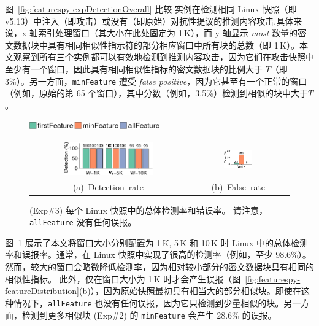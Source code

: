   图~\ref{fig:featurespy-expDetectionOverall} 比较 \sysnameF 实例在检测相同 Linux 快照（即 v5.13）中注入（即攻击）或没有（即原始）对抗性提议的推测内容攻击.具体来说，x 轴索引处理窗口（其大小在此处固定为 1\,K），而 y 轴显示 {\em most} 数量的密文数据块中具有相同相似性指示符的部分相应窗口中所有块的总数（即 1\,K）。本文观察到所有三个实例都可以有效地检测到推测内容攻击，因为它们在攻击快照中至少有一个窗口，因此具有相同相似性指标的密文数据块的比例大于 $T $（即 3\%）。另一方面，{\tt minFeature} 遭受 {\em false positive}，因为它甚至有一个正常的窗口（例如，原始的第 65 个窗口），其中分数（例如，3.5\%）检测到相似的块中大于$T$。


\begin{figure}[t]
    \centering
    \includegraphics[width=0.5\textwidth]{pic/featurespy/plot/detection/overall/effectiveness-falsePositive_legend.pdf}
    \vspace{5pt}\\
    \begin{tabular}{@{\ }c@{\ }c}
        \includegraphics[width=0.6\textwidth]{pic/featurespy/plot/detection/overall/effectivenessLinux.pdf} &
        \includegraphics[width=0.3\textwidth]{pic/featurespy/plot/detection/overall/falsePositiveLinux.pdf}\\
        \mbox{\small (a) Detection rate} &
        \mbox{\small (b) False rate}\\
    \end{tabular}
    \vspace{-6pt}
    \caption{(Exp\#3) 每个 Linux 快照中的总体检测率和错误率。 请注意，{\tt allFeature} 没有任何误报。}
    \vspace{-6pt}
    \label{fig:featurespy-expDetectionOverallFalsePositive}
\end{figure}

图~\ref{fig:featurespy-expDetectionOverallFalsePositive} 展示了本文将窗口大小分别配置为 1\,K, 5\,K 和 10\,K 时 Linux 中的总体检测率和误报率。通常，\sysnameF 在 Linux 快照中实现了很高的检测率（例如，至少 98.6\%）。然而，较大的窗口会略微降低检测率，因为相对较小部分的密文数据块具有相同的相似性指标。
此外，\sysnameF 仅在窗口大小为 1\,K 时才会产生误报（图~\ref{fig:featurespy-featureDistribution}(b)），因为原始快照最初具有相当大的部分相似块。即使在这种情况下，{\tt allFeature} 也没有任何误报，因为它只检测到少量相似的块。另一方面，检测到更多相似块 (Exp\#2) 的 {\tt minFeature} 会产生 28.6\% 的误报。


